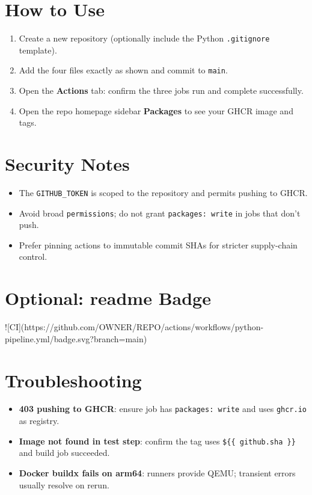 \documentclass[11pt]{article}
\begin{document}
\section{How to Use}

\begin{enumerate}
  \item Create a new repository (optionally include the Python \texttt{.gitignore} template).
  \item Add the four files exactly as shown and commit to \texttt{main}.
  \item Open the \textbf{Actions} tab: confirm the three jobs run and complete successfully.
  \item Open the repo homepage sidebar \textbf{Packages} to see your GHCR image and tags.
\end{enumerate}

\section{Security Notes}

\begin{itemize}
  \item The \texttt{GITHUB\_TOKEN} is scoped to the repository and permits pushing to GHCR.
  \item Avoid broad \texttt{permissions}; do not grant \texttt{packages: write} in jobs that don't push.
  \item Prefer pinning actions to immutable commit SHAs for stricter supply-chain control.
\end{itemize}

\section{Optional: readme Badge}

\begin{mdframed}[style=codebox]
\begin{textcode}
![CI](https://github.com/OWNER/REPO/actions/workflows/python-pipeline.yml/badge.svg?branch=main)
\end{textcode}
\end{mdframed}

\section{Troubleshooting}

\begin{itemize}
  \item \textbf{403 pushing to GHCR}: ensure job has \texttt{packages: write} and uses \texttt{ghcr.io} as registry.
  \item \textbf{Image not found in test step}: confirm the tag uses \texttt{\$\{\{ github.sha \}\}} and build job succeeded.
  \item \textbf{Docker buildx fails on arm64}: runners provide QEMU; transient errors usually resolve on rerun.
\end{itemize}
\end{document}
